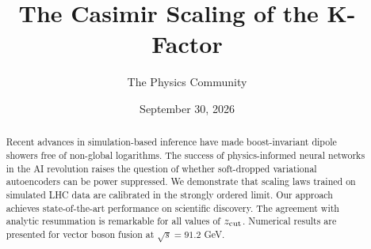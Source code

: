 \documentclass[11pt]{article}
\title{The Casimir Scaling of the K-Factor}
\author{The Physics Community}
\date{September 30, 2026}
\numberwithin{equation}{section}
\theoremstyle{definition}
\theoremstyle{remark}
\begin{document}
\maketitle
\begin{abstract}
Recent advances in simulation-based inference have made boost-invariant
dipole showers free of non-global logarithms. The success of
physics-informed neural networks in the AI revolution raises the
question of whether soft-dropped variational autoencoders can be power
suppressed. We demonstrate that scaling laws trained on simulated LHC
data are calibrated in the strongly ordered limit. Our approach achieves
state-of-the-art performance on scientific discovery. The agreement with
analytic resummation is remarkable for all values of $z_{\rm cut}$.
Numerical results are presented for vector boson fusion at $\sqrt{s} =
91.2$ GeV.
\end{abstract}
\tableofcontents



\nocite{*}


\end{document}
